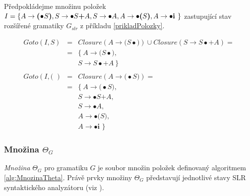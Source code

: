 \begin{priklad}
  Předpokládejme množinu položek $I = \{A \rightarrow \textbf{(}\!\bullet\!S \textbf{)}, S \rightarrow \bullet S \textbf{+} A, S \rightarrow \bullet A, \linebreak
  A \rightarrow \bullet \textbf{(} S \textbf{)}, A \rightarrow \bullet \textbf{i } \}$ zastupující stav rozšířené gramatiky $G_{slr}$ z příkladu \ref{prikladPolozky}.

  \begin{eqnarray*}
    Goto(I, S) & =  & Closure(A \rightarrow \textbf{(} S\!\bullet\!\textbf{)}) \cup Closure(S \rightarrow S\!\bullet\!\textbf{+} A) = \\
               & =  & \{\ A \rightarrow \textbf{(} S\!\bullet\!\textbf{)}, \\
               &    & S \rightarrow S\!\bullet\!\textbf{+} A\ \}\\
   \\
    Goto(I, \textbf{( })  & = & Closure(A \rightarrow \textbf{(}\!\bullet\!S \textbf{)}) = \\
                          & = & \{\ A \rightarrow \textbf{(}\!\bullet\!S \textbf{)}, \\
                          &   & S \rightarrow \bullet S \textbf{+} A, \\
                          &   & S \rightarrow \bullet A, \\
                          &   & A \rightarrow \bullet \textbf{(} S \textbf{)}, \\
                          &   & A \rightarrow \bullet \textbf{i }\}
  \end{eqnarray*}
\end{priklad}

\subsubsection{Množina $\Theta_G$}
\emph{Množina} $\Theta_G$ pro gramatiku $G$ je soubor množin položek definovaný algoritmem \ref{alg:MnozinaTheta}. Právě prvky množiny $\Theta_G$ představují
jednotlivé stavy SLR syntaktického analyzátoru (viz \cite{Alfred:2007:Compilers}).


